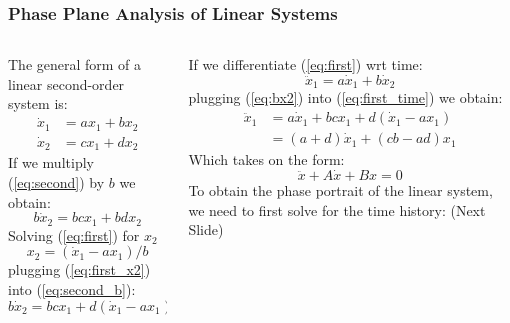 \documentclass[11pt,handout]{beamer}   %
\begin{document}
\begin{frame}
\frametitle{Phase Plane Analysis of Linear Systems}
\small
\begin{columns}
\begin{column}{0.5\textwidth}
The general form of a linear second-order system is:
\begin{eqnarray}
\label{eq:first}
\dot{x}_1 &= ax_1+bx_2\\
\label{eq:second}
\dot{x}_2 &= cx_1+dx_2
\end{eqnarray}
If we multiply (\ref{eq:second}) by $b$ we obtain:
\begin{equation}
\label{eq:second_b}
b\dot{x}_2 = bcx_1+bdx_2
\end{equation}
Solving (\ref{eq:first}) for $x_2$
\begin{equation}
\label{eq:first_x2}
x_2 = (\dot{x}_1-ax_1)/b
\end{equation}
plugging (\ref{eq:first_x2}) into (\ref{eq:second_b}):
\begin{equation}
\label{eq:bx2}
b\dot{x}_2 = bcx_1+d(\dot{x}_1-ax_1)
\end{equation}
\end{column}
\begin{column}{0.5\textwidth}
If we differentiate (\ref{eq:first}) wrt time:
\begin{equation}
\label{eq:first_time}
\ddot{x}_1 = a\dot{x}_1 + b\dot{x}_2
\end{equation}
plugging (\ref{eq:bx2}) into (\ref{eq:first_time}) we obtain:
\begin{equation}
\begin{aligned}
\ddot{x}_1 &= a\dot{x}_1 + bcx_1+d(\dot{x}_1-ax_1)\\
&= (a+d)\dot{x}_1 + (cb-ad)x_1
\end{aligned}
\end{equation}
Which takes on the form:
\begin{equation}
\label{eq:2ndOrder}
\ddot{x} + A\dot{x} + B x = 0
\end{equation}
To obtain the phase portrait of the linear system, we need to first solve for the time history: (Next Slide)
\end{column}
\end{columns}
\end{frame}
\end{document}
